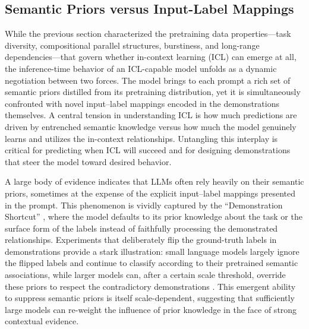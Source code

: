 \documentclass[11pt]{article}
\begin{document}
\subsection{Semantic Priors versus Input-Label Mappings}

While the previous section characterized the pretraining data properties---task diversity, compositional parallel structures, burstiness, and long-range dependencies---that govern whether in-context learning (ICL) can emerge at all, the inference-time behavior of an ICL-capable model unfolds as a dynamic negotiation between two forces. The model brings to each prompt a rich set of semantic priors distilled from its pretraining distribution, yet it is simultaneously confronted with novel input--label mappings encoded in the demonstrations themselves. A central tension in understanding ICL is how much predictions are driven by entrenched semantic knowledge versus how much the model genuinely learns and utilizes the in-context relationships. Untangling this interplay is critical for predicting when ICL will succeed and for designing demonstrations that steer the model toward desired behavior.

A large body of evidence indicates that LLMs often rely heavily on their semantic priors, sometimes at the expense of the explicit input--label mappings presented in the prompt. This phenomenon is vividly captured by the ``Demonstration Shortcut'' \cite{ref39}, where the model defaults to its prior knowledge about the task or the surface form of the labels instead of faithfully processing the demonstrated relationships. Experiments that deliberately flip the ground-truth labels in demonstrations provide a stark illustration: small language models largely ignore the flipped labels and continue to classify according to their pretrained semantic associations, while larger models can, after a certain scale threshold, override these priors to respect the contradictory demonstrations \cite{ref40}. This emergent ability to suppress semantic priors is itself scale-dependent, suggesting that sufficiently large models can re-weight the influence of prior knowledge in the face of strong contextual evidence.
\end{document}
